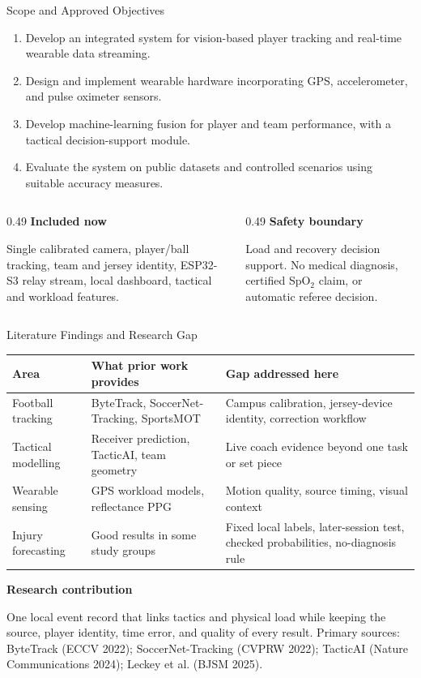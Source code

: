 \documentclass[aspectratio=169,10pt]{beamer}
\newcommand{\smallsource}[1]{\vfill{\tiny\color{muted}#1}}
\begin{document}
\begin{frame}{Scope and Approved Objectives}
\small
\begin{enumerate}
  \item Develop an integrated system for vision-based player tracking and real-time wearable data streaming.
  \item Design and implement wearable hardware incorporating GPS, accelerometer, and pulse oximeter sensors.
  \item Develop machine-learning fusion for player and team performance, with a tactical decision-support module.
  \item Evaluate the system on public datasets and controlled scenarios using suitable accuracy measures.
\end{enumerate}
\vspace{0.25cm}
\begin{columns}[T,onlytextwidth]
\begin{column}{0.49\textwidth}
\textbf{Included now}\par
Single calibrated camera, player/ball tracking, team and jersey identity, ESP32-S3 relay stream, local dashboard, tactical and workload features.
\end{column}
\begin{column}{0.49\textwidth}
\textbf{Safety boundary}\par
Load and recovery decision support. No medical diagnosis, certified SpO$_2$ claim, or automatic referee decision.
\end{column}
\end{columns}
\end{frame}

\begin{frame}{Literature Findings and Research Gap}
\scriptsize
\begin{tabularx}{\textwidth}{p{2.5cm}X X}
\toprule
\textbf{Area} & \textbf{What prior work provides} & \textbf{Gap addressed here}\\
\midrule
Football tracking & ByteTrack, SoccerNet-Tracking, SportsMOT & Campus calibration, jersey-device identity, correction workflow\\
Tactical modelling & Receiver prediction, TacticAI, team geometry & Live coach evidence beyond one task or set piece\\
Wearable sensing & GPS workload models, reflectance PPG & Motion quality, source timing, visual context\\
Injury forecasting & Good results in some study groups & Fixed local labels, later-session test, checked probabilities, no-diagnosis rule\\
\bottomrule
\end{tabularx}
\vspace{0.35cm}
\textbf{Research contribution}\par
One local event record that links tactics and physical load while keeping the source, player identity, time error, and quality of every result.
\smallsource{Primary sources: ByteTrack (ECCV 2022); SoccerNet-Tracking (CVPRW 2022); TacticAI (Nature Communications 2024); Leckey et al. (BJSM 2025).}
\end{frame}
\end{document}
